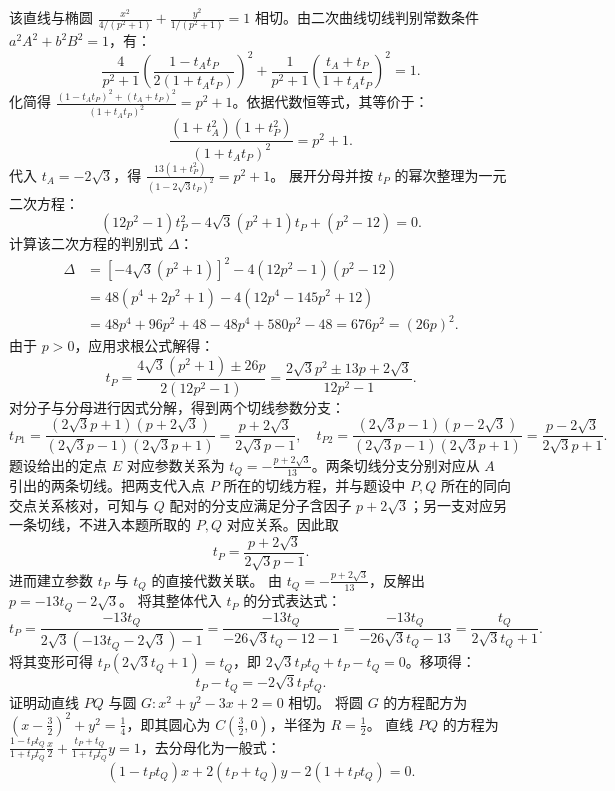 \begin{solution}
该直线与椭圆 $\frac{x^2}{4/(p^2+1)} + \frac{y^2}{1/(p^2+1)} = 1$ 相切。由二次曲线切线判别常数条件 $a^2 A^2 + b^2 B^2 = 1$，有：
\[
\frac{4}{p^2+1} \left( \frac{1-t_A t_P}{2(1+t_A t_P)} \right)^2 + \frac{1}{p^2+1} \left( \frac{t_A+t_P}{1+t_A t_P} \right)^2 = 1.
\]
化简得 $\frac{(1-t_A t_P)^2 + (t_A+t_P)^2}{(1+t_A t_P)^2} = p^2 + 1$。依据代数恒等式，其等价于：
\[
\frac{(1+t_A^2)(1+t_P^2)}{(1+t_A t_P)^2} = p^2 + 1.
\]
代入 $t_A = -2\sqrt{3}$，得 $\frac{13(1+t_P^2)}{(1-2\sqrt{3}t_P)^2} = p^2 + 1$。
展开分母并按 $t_P$ 的幂次整理为一元二次方程：
\[
(12p^2 - 1)t_P^2 - 4\sqrt{3}(p^2+1)t_P + (p^2 - 12) = 0.
\]
计算该二次方程的判别式 $\Delta$：
\begin{align*}
\Delta &= \left[-4\sqrt{3}(p^2+1)\right]^2 - 4(12p^2-1)(p^2-12) \\
&= 48(p^4 + 2p^2 + 1) - 4(12p^4 - 145p^2 + 12) \\
&= 48p^4 + 96p^2 + 48 - 48p^4 + 580p^2 - 48 = 676p^2 = (26p)^2.
\end{align*}
由于 $p > 0$，应用求根公式解得：
\[
t_P = \frac{4\sqrt{3}(p^2+1) \pm 26p}{2(12p^2-1)} = \frac{2\sqrt{3}p^2 \pm 13p + 2\sqrt{3}}{12p^2-1}.
\]
对分子与分母进行因式分解，得到两个切线参数分支：
\[
t_{P1} = \frac{(2\sqrt{3}p + 1)(p + 2\sqrt{3})}{(2\sqrt{3}p - 1)(2\sqrt{3}p + 1)} = \frac{p + 2\sqrt{3}}{2\sqrt{3}p - 1}, \quad t_{P2} = \frac{(2\sqrt{3}p - 1)(p - 2\sqrt{3})}{(2\sqrt{3}p - 1)(2\sqrt{3}p + 1)} = \frac{p - 2\sqrt{3}}{2\sqrt{3}p + 1}.
\]
题设给出的定点 $E$ 对应参数关系为 $t_Q = -\frac{p + 2\sqrt{3}}{13}$。两条切线分支分别对应从 $A$ 引出的两条切线。把两支代入点 $P$ 所在的切线方程，并与题设中 $P,Q$ 所在的同向交点关系核对，可知与 $Q$ 配对的分支应满足分子含因子 $p+2\sqrt3$；另一支对应另一条切线，不进入本题所取的 $P,Q$ 对应关系。因此取
$$t_P = \frac{p + 2\sqrt{3}}{2\sqrt{3}p - 1}.$$
进而建立参数 $t_P$ 与 $t_Q$ 的直接代数关联。
由 $t_Q = -\frac{p + 2\sqrt{3}}{13}$，反解出 $p = -13t_Q - 2\sqrt{3}$。
将其整体代入 $t_P$ 的分式表达式：
\[
t_P = \frac{-13t_Q}{2\sqrt{3}(-13t_Q - 2\sqrt{3}) - 1} = \frac{-13t_Q}{-26\sqrt{3}t_Q - 12 - 1} = \frac{-13t_Q}{-26\sqrt{3}t_Q - 13} = \frac{t_Q}{2\sqrt{3}t_Q + 1}.
\]
将其变形可得 $t_P(2\sqrt{3}t_Q + 1) = t_Q$，即 $2\sqrt{3}t_P t_Q + t_P - t_Q = 0$。移项得：
\[
t_P - t_Q = -2\sqrt{3} t_P t_Q.
\]
证明动直线 $PQ$ 与圆 $G: x^2 + y^2 - 3x + 2 = 0$ 相切。
将圆 $G$ 的方程配方为 $\left(x - \frac{3}{2}\right)^2 + y^2 = \frac{1}{4}$，即其圆心为 $C\left(\frac{3}{2}, 0\right)$，半径为 $R = \frac{1}{2}$。
直线 $PQ$ 的方程为 $\frac{1-t_P t_Q}{1+t_P t_Q} \frac{x}{2} + \frac{t_P+t_Q}{1+t_P t_Q} y = 1$，去分母化为一般式：
\[
(1 - t_P t_Q)x + 2(t_P + t_Q)y - 2(1 + t_P t_Q) = 0.
\]
\end{solution}
